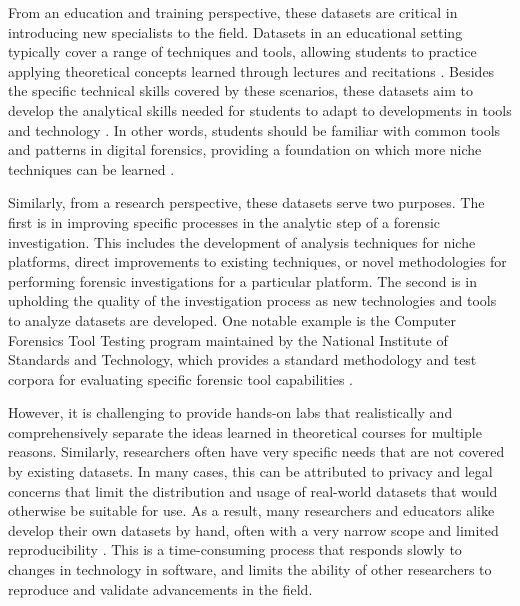 From an education and training perspective, these datasets are critical
in introducing new specialists to the field. Datasets in an educational
setting typically cover a range of techniques and tools, allowing
students to practice applying theoretical concepts learned through
lectures and recitations
\cite{adelsteinAutomaticallyCreatingRealistic2005}. Besides the
specific technical skills covered by these scenarios, these datasets aim
to develop the analytical skills needed for students to adapt to
developments in tools and technology
\cite{cooperStandardsDigitalForensics2010}. In other words, students
should be familiar with common tools and patterns in digital forensics,
providing a foundation on which more niche techniques can be learned
\cite{lawrenceFrameworkDesignWebbased2009}.

Similarly, from a research perspective, these datasets serve two
purposes. The first is in improving specific processes in the analytic
step of a forensic investigation. This includes the development of
analysis techniques for niche platforms, direct improvements to existing
techniques, or novel methodologies for performing forensic
investigations for a particular platform. The second is in upholding the
quality of the investigation process as new technologies and tools to
analyze datasets are developed. One notable example is the Computer
Forensics Tool Testing program maintained by the National Institute of
Standards and Technology, which provides a standard methodology and test
corpora for evaluating specific forensic tool capabilities
\cite{nationalinstituteofstandardsandtechnologyComputerForensicsTool2017}.

However, it is challenging to provide hands-on labs that realistically
and comprehensively separate the ideas learned in theoretical courses
\cite{adelsteinAutomaticallyCreatingRealistic2005,guptaDigitalForensicsLab2022,lawrenceFrameworkDesignWebbased2009}
for multiple reasons. Similarly, researchers often have very specific
needs that are not covered by existing datasets. In many cases, this can
be attributed to privacy and legal concerns that limit the distribution
and usage of real-world datasets that would otherwise be suitable for
use. As a result, many researchers and educators alike develop their own
datasets by hand, often with a very narrow scope and limited
reproducibility
\cite{garfinkelBringingScienceDigital2009,grajedaAvailabilityDatasetsDigital2017}.
This is a time-consuming process that responds slowly to changes in
technology in software, and limits the ability of other researchers to
reproduce and validate advancements in the field.

